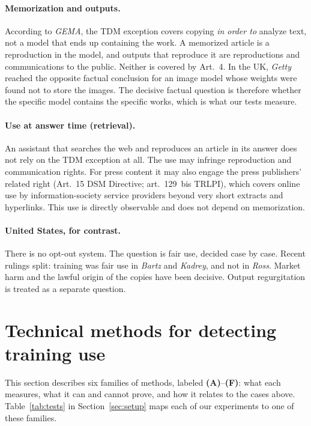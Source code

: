 \documentclass[10pt,a4paper]{article}
\begin{document}
\paragraph{Memorization and outputs.} According to \emph{GEMA}, the TDM exception covers copying \emph{in order to}
analyze text, not a model that ends up containing the work. A memorized article is a reproduction in the model, and
outputs that reproduce it are reproductions and communications to the public. Neither is covered by Art.~4. In the UK,
\emph{Getty} reached the opposite factual conclusion for an image model whose weights were found not to store the
images. The decisive factual question is therefore whether the specific model contains the specific works, which is
what our tests measure.

\paragraph{Use at answer time (retrieval).} An assistant that searches the web and reproduces an article in its answer
does not rely on the TDM exception at all. The use may infringe reproduction and communication rights. For press
content it may also engage the press publishers' related right (Art.~15 DSM Directive; art.~129~bis TRLPI), which
covers online use by information-society service providers beyond very short extracts and hyperlinks. This use is
directly observable and does not depend on memorization.

\paragraph{United States, for contrast.} There is no opt-out system. The question is fair use, decided case by case.
Recent rulings split: training was fair use in \emph{Bartz} and \emph{Kadrey}, and not in \emph{Ross}. Market harm and
the lawful origin of the copies have been decisive. Output regurgitation is treated as a separate question.

\section{Technical methods for detecting training use}\label{sec:methods-bg}
This section describes six families of methods, labeled \textbf{(A)}--\textbf{(F)}: what each measures, what it can
and cannot prove, and how it relates to the cases above. Table~\ref{tab:tests} in Section~\ref{sec:setup} maps each
of our experiments to one of these families.
\end{document}

